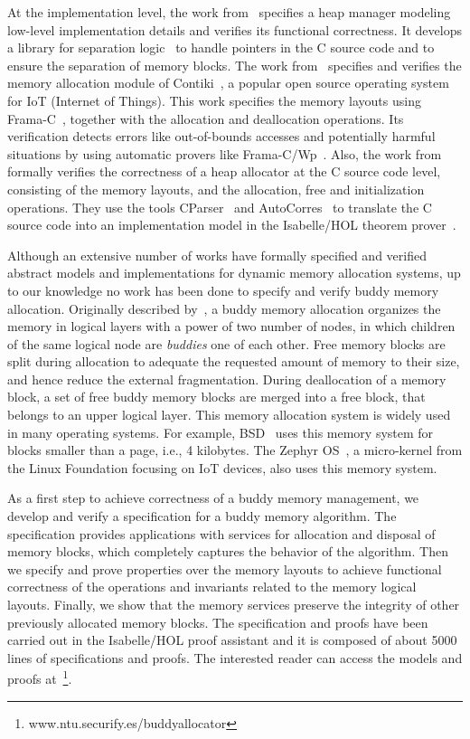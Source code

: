 At the implementation level, the work from~\cite{reg_marti} specifies a heap manager modeling low-level implementation details and verifies its functional correctness. It develops a library for separation logic~\cite{reg_reynolds} to handle pointers in the C source code and to ensure the separation of memory blocks. The work from~\cite{reg_mangano} specifies and verifies the memory allocation module of Contiki~\cite{reg_dunkers}, a popular open source operating system for IoT (Internet of Things). This work specifies the memory layouts using Frama-C~\cite{reg_kirchner}, together with the allocation and deallocation operations. Its verification detects errors like out-of-bounds accesses and potentially harmful situations by using automatic provers like Frama-C/Wp~\cite{reg_allan}. Also, the work from~\cite{reg_sahebolamri} formally verifies the correctness of a heap allocator at the C source code level, consisting of the memory layouts, and the allocation, free and initialization operations. They use the tools CParser~\cite{reg_tuch} and AutoCorres~\cite{reg_greenaway} to translate the C source code into an implementation model in the Isabelle/HOL theorem prover~\cite{reg_Isabelle/HOL}.

Although an extensive number of works have formally specified and verified abstract models and implementations for dynamic memory allocation systems, up to our knowledge no work has been done to specify and verify buddy memory allocation. Originally described by~\cite{reg_knowlton}, a buddy memory allocation organizes the memory in logical layers with a power of two number of nodes, in which children of the same logical node are \emph{buddies} one of each other. Free memory blocks are split during allocation to adequate the requested amount of memory to their size, and hence reduce the external fragmentation. During deallocation of a memory block, a set of free buddy memory blocks are merged into a free block, that belongs to an upper logical layer. This memory allocation system is widely used in many operating systems. For example, BSD~\cite{reg_mckusick} uses this memory system for blocks smaller than a page, i.e., 4 kilobytes. The Zephyr OS~\cite{reg_zephyr}, a micro-kernel from the Linux Foundation focusing on IoT devices, also uses this memory system.

As a first step to achieve correctness of a buddy memory management, we develop and verify a specification for a buddy memory algorithm. The specification provides applications with services for allocation and disposal of memory blocks, which completely captures the behavior of the algorithm. Then we specify and prove properties over the memory layouts to achieve functional correctness of the operations and invariants related to the memory logical layouts. Finally, we show that the memory services preserve the integrity of other previously allocated memory blocks. The specification and proofs have been carried out in the Isabelle/HOL proof assistant and it is composed of about 5000 lines of specifications and proofs. The interested reader can access the models and proofs at~\footnote{www.ntu.securify.es/buddyallocator}.

